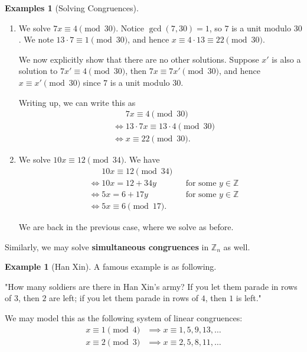 \documentclass{article}
\theoremstyle{definition}
\newtheorem{example}[theorem]{Example}
\newtheorem{examples}[theorem]{Examples}
\theoremstyle{remark}
\newcommand{\pqty}[1]{\left(#1\right)}
\newcommand{\ZZ}{\mathbb{Z}}
\begin{document}
\begin{examples}[Solving Congruences]
    \begin{enumerate}
        \item We solve \(7x \equiv 4 \pmod{30}\). Notice \(\gcd\pqty{7, 30} = 1\), so \(7\) is a unit modulo \(30\). We note \(13 \cdot 7 \equiv 1 \pmod{30}\), and hence \(x \equiv 4 \cdot 13 \equiv 22 \pmod{30}\).
        
        We now explicitly show that there are no other solutions. Suppose \(x'\) is also a solution to \(7 x' \equiv 4 \pmod{30}\), then \(7x \equiv 7x' \pmod{30}\), and hence \(x \equiv x' \pmod{30}\) since \(7\) is a unit modulo \(30\).

        Writing up, we can write this as
        \begin{align*}
            &\phantom{\iff} 7x \equiv 4 \pmod{30} \\
            &\iff 13 \cdot 7x \equiv 13 \cdot 4 \pmod{30} \\
            &\iff x \equiv 22 \pmod{30}.
        \end{align*}

        \item We solve \(10 x \equiv 12 \pmod{34}\). We have
        \begin{align*}
            &\phantom{\iff} 10x \equiv 12 \pmod{34} \\
            &\iff 10x = 12 + 34y && \text{for some } y \in \ZZ \\
            &\iff 5x = 6 + 17y && \text{for some } y \in \ZZ \\
            &\iff 5x \equiv 6 \pmod{17}.
        \end{align*}

        We are back in the previous case, where we solve as before.
    \end{enumerate}
\end{examples}

Similarly, we may solve \textbf{simultaneous congruences} in \(\ZZ_n\) as well.

\begin{example}[Han Xin]
    A famous example is as following.

    "How many soldiers are there in Han Xin's army? If you let them parade in rows of \(3\), then \(2\) are left; if you let them parade in rows of \(4\), then \(1\) is left."

    We may model this as the following system of linear congruences:
    \begin{align*}
        x \equiv 1 \pmod{4} &\implies x \equiv 1, \boxed{5}, 9, 13, \ldots \\
        x \equiv 2 \pmod{3} &\implies x \equiv 2, \boxed{5}, 8, 11, \ldots
    \end{align*}
\end{example}
\end{document}
